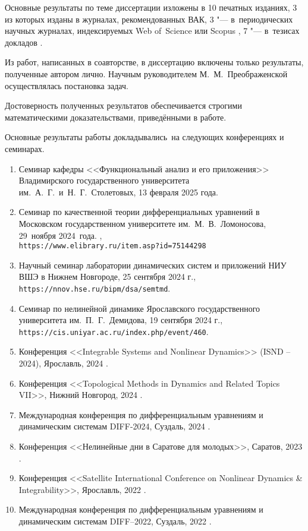 Основные результаты по теме диссертации изложены в 10 печатных изданиях, 3 из которых \cite{wosbib1,wosbib2,scbib1} изданы в журналах, рекомендованных ВАК, 3 "--- в~периодических научных журналах, индексируемых Web of~Science или Scopus \cite{wosbib1,wosbib2,scbib1}, 7 "--- в~тезисах докладов \cite{Sergeev2024,confbib1,confbib2,confbib3,confbib4,confbib5,confbib6}.

Из работ, написанных в соавторстве, в диссертацию включены только результаты, полученные автором лично. Научным руководителем М.~М.~Преображенской осуществлялась постановка задач.

Достоверность полученных результатов обеспечивается строгими математическими доказательствами, приведёнными в работе.

\nocite{scbib1, wosbib1, wosbib2}

\bigskip

{\probation}
Основные результаты работы докладывались~на следующих конференциях и семинарах.
\begin{enumerate}
	\item Семинар кафедры <<Функциональный анализ и его приложения>> Владимирского государственного университета им.~А.~Г.~и~Н.~Г.~Столетовых, 13 февраля 2025 года.
	\item Семинар по качественной теории дифференциальных уравнений в Московском государственном университете им.~М.~В.~Ломоносова, 29~ноября 2024~года. \cite{Sergeev2024},\\\texttt{https://www.elibrary.ru/item.asp?id=75144298}
	\item Научный семинар лаборатории динамических систем и приложений НИУ ВШЭ в Нижнем Новгороде, 25 сентября 2024 г.,\\\texttt{https://nnov.hse.ru/bipm/dsa/semtmd}.
	\item Семинар по нелинейной динамике Ярославского государственного университета им.~П.~Г.~Демидова, 19 сентября 2024 г.,\\\texttt{https://cis.uniyar.ac.ru/index.php/event/460}.
	\item Конференция <<Integrable Systems and Nonlinear Dynamics>> (ISND – 2024), Ярославль, 2024 \cite{confbib5}.
	\item Конференция <<Topological Methods in Dynamics and Related Topics VII>>, Нижний Новгород, 2024 \cite{confbib6}.
	\item Международная конференция по дифференциальным уравнениям и динамическим системам DIFF-2024, Суздаль, 2024 \cite{confbib3}.
	\item Конференция <<Нелинейные дни в Саратове для молодых>>, Саратов, 2023 \cite{confbib2}.
	\item Конференция <<Satellite International Conference on Nonlinear Dynamics {\&} Integrability>>, Ярославль, 2022 \cite{confbib4}.
	\item Международная конференция по дифференциальным уравнениям и динамическим системам DIFF--2022, Суздаль, 2022 \cite{confbib1}.
\end{enumerate}

